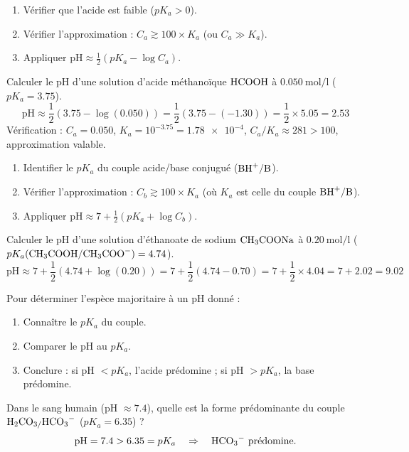 \begin{enumerate}
    \item Vérifier que l'acide est faible ($pK_a > 0$).
    \item Vérifier l'approximation : $C_a \gtrsim 100 \times K_a$ (ou $C_a \gg K_a$).
    \item Appliquer $\text{pH} \approx \frac{1}{2}(pK_a - \log C_a)$.
\end{enumerate}
\begin{exemple}
Calculer le pH d'une solution d'acide méthanoïque $\ce{HCOOH}$ à $\SI{0.050}{\mol\per\litre}$ ($pK_a = 3.75$).
\[
\text{pH} \approx \frac{1}{2}(3.75 - \log(0.050)) = \frac{1}{2}(3.75 - (-1.30)) = \frac{1}{2} \times 5.05 = 2.53
\]
Vérification : $C_a = 0.050$, $K_a = 10^{-3.75} = \num{1.78e-4}$, $C_a / K_a \approx 281 > 100$, approximation valable.
\end{exemple}

\begin{enumerate}
    \item Identifier le $pK_a$ du couple acide/base conjugué ($\ce{BH+/B}$).
    \item Vérifier l'approximation : $C_b \gtrsim 100 \times K_a$ (où $K_a$ est celle du couple $\ce{BH+/B}$).
    \item Appliquer $\text{pH} \approx 7 + \frac{1}{2}(pK_a + \log C_b)$.
\end{enumerate}
\begin{exemple}
Calculer le pH d'une solution d'éthanoate de sodium $\ce{CH3COONa}$ à $\SI{0.20}{\mol\per\litre}$ ($pK_a(\ce{CH3COOH/CH3COO-}) = 4.74$).
\[
\text{pH} \approx 7 + \frac{1}{2}(4.74 + \log(0.20)) = 7 + \frac{1}{2}(4.74 - 0.70) = 7 + \frac{1}{2} \times 4.04 = 7 + 2.02 = 9.02
\]
\end{exemple}

Pour déterminer l'espèce majoritaire à un pH donné :
\begin{enumerate}
    \item Connaître le $pK_a$ du couple.
    \item Comparer le pH au $pK_a$.
    \item Conclure : si pH $< pK_a$, l'acide prédomine ; si pH $> pK_a$, la base prédomine.
\end{enumerate}
\begin{exemple}
Dans le sang humain (pH $\approx 7.4$), quelle est la forme prédominante du couple $\ce{H2CO3/HCO3-}$ ($pK_a = 6.35$) ?
\[
\text{pH} = 7.4 > 6.35 = pK_a \quad \Rightarrow \quad \ce{HCO3-} \text{ prédomine.}
\]
\end{exemple}

